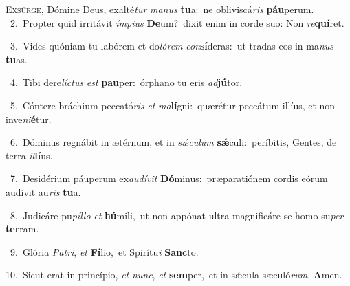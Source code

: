 \lettrine{\initial\textcolor{\initialcolor}{E}}{xsúrge,} Dómine Deus, exalté\textit{tur} \textit{ma}\-\textit{nus} \textbf{tu}\-a:~\star ne obliviscá\textit{ris} \textbf{páu}\-perum.\\
{\numbfont\textcolor{\numbcolor}{~2.}}~Propter quid irritávit \textit{ím}\-\textit{pi}\textit{us} \textbf{De}\-um?~\star dixit enim in corde suo: Non \textit{re}\-\textbf{quí}ret.\par
{\numbfont\textcolor{\numbcolor}{~3.}}~Vides quóniam tu labórem et do\-\textit{ló}\-\textit{rem} \textit{con}\-\textbf{sí}deras:~\star ut tradas eos in ma\textit{nus} \textbf{tu}\-as.\par
{\numbfont\textcolor{\numbcolor}{~4.}}~Tibi dere\-\textit{líc}\-\textit{tus} \textit{est} \textbf{pau}\-per:~\star órphano tu eris \textit{ad}\-\textbf{jú}tor.\par
{\numbfont\textcolor{\numbcolor}{~5.}}~Cóntere bráchium peccató\textit{ris} \textit{et} \textit{ma}\-\textbf{lí}gni:~\star quærétur peccátum illíus, et non inve\-\textit{ni}\-\textbf{é}tur.\par
{\numbfont\textcolor{\numbcolor}{~6.}}~Dóminus regnábit in ætérnum, et in \textit{sǽ}\-\textit{cu}\textit{lum} \textbf{sǽ}\-culi:~\star períbitis, Gentes, de terra \textit{il}\-\textbf{lí}us.\par
{\numbfont\textcolor{\numbcolor}{~7.}}~Desidérium páuperum ex\-\textit{au}\-\textit{dí}\textit{vit} \textbf{Dó}\-minus:~\star præparatiónem cordis eórum audívit au\textit{ris} \textbf{tu}\-a.\par
{\numbfont\textcolor{\numbcolor}{~8.}}~Judicáre pu\-\textit{píl}\-\textit{lo} \textit{et} \textbf{hú}\-mili,~\star ut non appónat ultra magnificáre se homo su\textit{per} \textbf{ter}\-ram.\par
{\numbfont\textcolor{\numbcolor}{~9.}}~Glória \textit{Pa}\-\textit{tri}, \textit{et} \textbf{Fí}\-lio,~\star et Spirítu\textit{i} \textbf{Sanc}\-to.\par
{\numbfont\textcolor{\numbcolor}{10.}}~Sicut erat in princípio, \textit{et} \textit{nunc}\-, \textit{et} \textbf{sem}\-per,~\star et in sǽcula sæculó\-\textit{rum}\-. \textbf{A}\-men.\par
